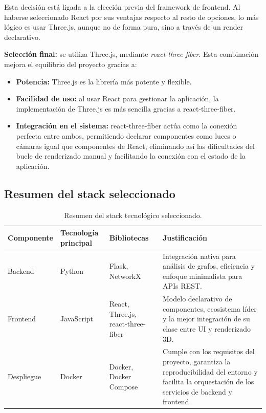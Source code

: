 Esta decisión está ligada a la elección previa del framework de frontend. Al haberse
seleccionado React por sus ventajas respecto al resto de opciones, lo más lógico es usar
Three.js, aunque no de forma pura, sino a través de un render declarativo.

\textbf{Selección final:} se utiliza Three.js, mediante \textit{react-three-fiber}. Esta
combinación mejora el equilibrio del proyecto gracias a:

\begin{itemize}
	\item \textbf{Potencia:} Three.js es la librería más potente y flexible.
	\item \textbf{Facilidad de uso:} al usar React para gestionar la aplicación, la
		implementación de Three.js es más sencilla gracias a react-three-fiber.
	\item \textbf{Integración en el sistema:} react-three-fiber actúa como la conexión perfecta
		entre ambos, permitiendo declarar componentes como luces o cámaras igual que
		componentes de React, eliminando así las dificultades del bucle de renderizado
		manual y facilitando la conexión con el estado de la aplicación.
\end{itemize}

\subsection{Resumen del stack seleccionado}

\begin{table}[H]
	\centering
	\caption{Resumen del stack tecnológico seleccionado.}
	\small
	\begin{tabularx}{\textwidth}{>{\raggedright\arraybackslash}p{2.2cm} >{\raggedright\arraybackslash}p{2.3cm} >{\raggedright\arraybackslash}p{2.9cm} >{\raggedright\arraybackslash}X}
		\toprule
		\textbf{Componente} & \textbf{Tecnología principal} & \textbf{Bibliotecas} & \textbf{Justificación} \\
		\midrule
		Backend & Python & Flask, NetworkX &
			Integración nativa para análisis de grafos, eficiencia y enfoque minimalista
			para APIs REST. \\
		\addlinespace
		Frontend & JavaScript & React, Three.js, react-three-fiber &
			Modelo declarativo de componentes, ecosistema líder y la mejor
			integración de su clase entre UI y renderizado 3D. \\
		\addlinespace
		Despliegue & Docker & Docker, Docker Compose &
			Cumple con los requisitos del proyecto, garantiza la reproducibilidad del
			entorno y facilita la orquestación de los servicios de backend y frontend. \\
		\bottomrule
	\end{tabularx}
\end{table}

